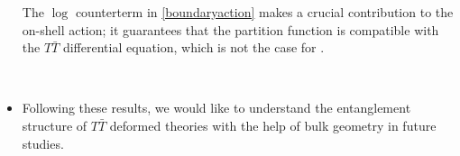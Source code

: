 \documentclass[10pt]{article}
\newcommand{\citations}[1]{{\footnotesize#1\par}}
\newcommand{\TTbar}{\texorpdfstring{\ensuremath{T\bar{T}}}{TTbar}\xspace}
\begin{document}
\begin{multicols}{3}
\begin{itemize}
	The $\log$ counterterm in \eqref{boundaryaction} makes a crucial contribution to the on-shell action; it guarantees that the partition function is compatible with the $T\bar T$ differential equation, which is not the case for \cite{Donnelly:2018bef}.
	\begin{flushright}
		\vspace{-.6\baselineskip}
		\citations{
			\textcite{Caputa:2020lpa}\\
			\textcite{Li:2020zjb}
		}\vspace{-.8\baselineskip}
	\end{flushright}
	
	\item Following these results, we would like to understand the entanglement structure of \TTbar deformed theories with the help of bulk geometry in future studies.
	\begin{flushright}
		\vspace{-.5\baselineskip}
		\citations{
			\textcite{Lewkowycz:2019xse}
		}
	\end{flushright}
\end{itemize}

%	
%
%

\end{multicols}
\end{document}
